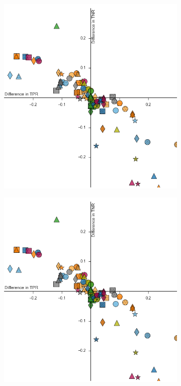 \documentclass{sig-alternate-05-2015}
\begin{document}
	\begin{figure}
		\centering
		\vspace*{-1.5cm}\hspace*{-1.5cm}\begin{subfigure}{.5\textwidth}
			\includegraphics[scale=0.61]{classifier_dataset_plt_2016-10-26_18-44-26}
			\label{fig:res}
		\end{subfigure}\hspace*{4cm}\vspace*{-0.5cm}%
		\hspace*{-2cm}\begin{subfigure}{.5\textwidth}
			\includegraphics[scale=0.61]{classifier_dataset_plt_2016-10-26_18-44-26}

\end{subfigure}
\end{figure}
\end{document}
